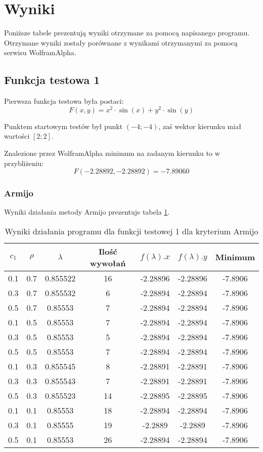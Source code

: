 \documentclass{classrep}
\begin{document}
\section{Wyniki}
Poniższe tabele prezentują wyniki otrzymane za pomocą napisanego programu. Otrzymane wyniki zostały porównane z wynikami otrzymanymi za pomocą serwisu WolframAlpha.

\subsection{Funkcja testowa 1}
Pierwsza funkcja testowa była postaci:
\begin{equation}
 F(x, y) = x^2 \cdot \sin(x) + y^2 \cdot \sin(y)
\end{equation}

Punktem startowym testów był punkt $(-4; -4)$, zaś wektor kierunku miał wartości $[2; 2]$.

Znalezione przez WolframAlpha minimum na zadanym kierunku to w przybliżeniu:
\begin{equation}
 F(-2.28892, -2.28892) = -7.89060
\end{equation}


\subsubsection{Armijo}

Wyniki działania metody Armijo prezentuje tabela \ref{armijo1}.

\begin{table}
  \centering
  \caption{Wyniki działania programu dla funkcji testowej 1 dla kryterium Armijo}
  \label{armijo1}
  \begin{tabular}{|c|c|c|c|c|c|c|}
    \hline
    $c_1$ & $\rho$ & $\lambda$ & Ilość wywołań & $f(\lambda).x$ & $f(\lambda).y$ & Minimum \\
    \hline
    0.1 & 0.7 & 0.855522 & 16 & -2.28896 & -2.28896 & -7.8906 \\
    0.3 & 0.7 & 0.855532 & 6 & -2.28894 & -2.28894 & -7.8906 \\
    0.5 & 0.7 & 0.85553 & 7 & -2.28894 & -2.28894 & -7.8906 \\
    0.1 & 0.5 & 0.85553 & 7 & -2.28894 & -2.28894 & -7.8906 \\
    0.3 & 0.5 & 0.85553 & 5 & -2.28894 & -2.28894 & -7.8906 \\
    0.5 & 0.5 & 0.85553 & 7 & -2.28894 & -2.28894 & -7.8906 \\
    0.1 & 0.3 & 0.855545 & 8 & -2.28891 & -2.28891 & -7.8906 \\
    0.3 & 0.3 & 0.855543 & 7 & -2.28891 & -2.28891 & -7.8906 \\
    0.5 & 0.3 & 0.855523 & 14 & -2.28895 & -2.28895 & -7.8906 \\
    0.1 & 0.1 & 0.85553 & 18 & -2.28894 & -2.28894 & -7.8906 \\
    0.3 & 0.1 & 0.85555 & 19 & -2.2889 & -2.2889 & -7.8906 \\
    0.5 & 0.1 & 0.85553 & 26 & -2.28894 & -2.28894 & -7.8906 \\
    \hline
  \end{tabular}
\end{table}
\end{document}
